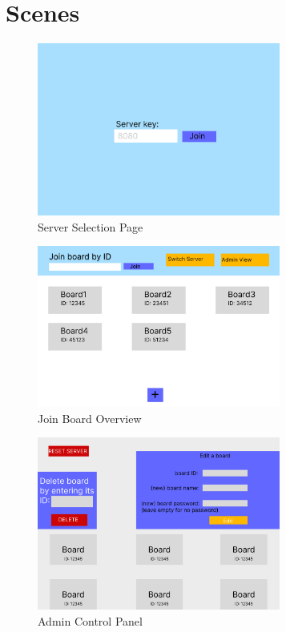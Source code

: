 
\section{Scenes}

\begin{figure}
    \caption{Server Selection Page}
    \includegraphics[width=8cm]{content/scenes/Server select.png}  
\end{figure}

\begin{figure}
    \caption{Join Board Overview}
    \includegraphics[width=8cm]{content/scenes/Join board overview.png}  
\end{figure}

\begin{figure}
   \caption{Admin Control Panel}
    \includegraphics[width=8cm]{content/scenes/Admin Control Panel.png}  
\end{figure}

